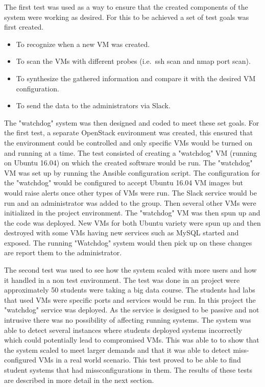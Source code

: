 \documentclass[12pt]{article}
\begin{document}
The first test was used as a way to ensure that the created components of the system were working as desired. For this to be achieved a set of test goals was first created.

\begin{itemize}
    \item To recognize when a new VM was created.
    \item To scan the VMs with different probes (i.e.\ ssh scan and nmap port scan).
    \item To synthesize the gathered information and compare it with the desired VM configuration.
    \item To send the data to the administrators via Slack.
\end{itemize}

The "watchdog" system was then designed and coded to meet these set goals. For the first test, a separate OpenStack environment was created, this ensured that the environment could be controlled and only specific VMs would be turned on and running at a time. The test consisted of creating a "watchdog" VM (running on Ubuntu 16.04) on which the created software would be run. The "watchdog" VM was set up by running the Ansible configuration script. The configuration for the "watchdog" would be configured to accept Ubuntu 16.04 VM images but would raise alerts once other types of VMs were run. The Slack service would be run and an administrator was added to the group. Then several other VMs were initialized in the project environment. The "watchdog" VM was then spun up and the code was deployed. New VMs for both Ubuntu variety were spun up and then destroyed with some VMs having new services such as MySQL started and exposed. The running "Watchdog" system would then pick up on these changes are report them to the administrator.

The second test was used to see how the system scaled with more users and how it handled in a non test environment. The test was done in an project were approximately 50 students were taking a big data course. The students had labs that used VMs were specific ports and services would be run. In this project the "watchdog" service was deployed. As the service is designed to be passive and not intrusive there was no possibility of affecting running systems. The system was able to detect several instances where students deployed systems incorrectly which could potentially lead to compromised VMs. This was able to to show that the system scaled to meet larger demands and that it was able to detect miss-configured VMs in a real world scenario. This test proved to be able to find student systems that had missconfigurations in them. The results of these tests are described in more detail in the next section.
\end{document}
